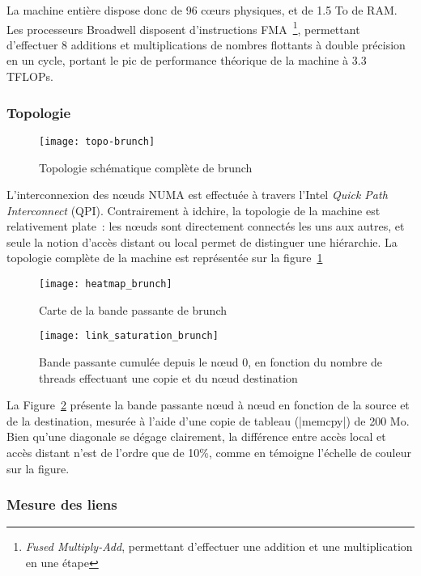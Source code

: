 La machine entière dispose donc de 96 cœurs physiques, et de 1.5 To de RAM.
Les processeurs Broadwell disposent d'instructions FMA~\footnote{\emph{Fused Multiply-Add}, permettant d'effectuer une addition et une multiplication en une étape}, permettant d'effectuer 8 additions et multiplications de nombres flottants à double précision en un cycle, portant le pic de performance théorique de la machine à 3.3 TFLOPs.


\subsubsection{Topologie}

\begin{figure}[ht]
  \centering
  \texttt{[image: topo-brunch]}
  \caption{Topologie schématique complète de brunch}\label{fig:contribs:machines:brunch:topo-liens}
\end{figure}

L'interconnexion des nœuds NUMA est effectuée à travers l'Intel \emph{Quick Path Interconnect} (QPI).
Contrairement à idchire, la topologie de la machine est relativement plate~: les nœuds sont directement connectés les uns aux autres, et seule la notion d'accès distant ou local permet de distinguer une hiérarchie.
La topologie complète de la machine est représentée sur la figure~\ref{fig:contribs:machines:brunch:topo-liens}

\begin{figure}[t!]
  \centering
  \texttt{[image: heatmap\_brunch]}
  \caption{Carte de la bande passante de brunch}\label{fig:contribs:machines:brunch:heatmap}
\end{figure}
\begin{figure}[h!]
  \centering
  \texttt{[image: link\_saturation\_brunch]}
  \caption{Bande passante cumulée depuis le nœud 0, en fonction du nombre de threads effectuant une copie et du nœud destination}\label{fig:contribs:machines:brunch:saturation}
\end{figure}


La Figure~\ref{fig:contribs:machines:brunch:heatmap} présente la bande passante nœud à nœud en fonction de la source et de la destination, mesurée à l'aide d'une copie de tableau (|memcpy|) de 200 Mo.
Bien qu'une diagonale se dégage clairement, la différence entre accès local et accès distant n'est de l'ordre que de 10\%, comme en témoigne l'échelle de couleur sur la figure.

\subsubsection{Mesure des liens}

